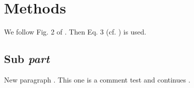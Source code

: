 \section{Methods}
We follow Fig. 2 of \cite{beta}. Then Eq. 3 (cf. \cite{gamma}) is used.

\subsection{Sub \emph{part}}
New paragraph \cite{missing_key}. This one is a comment test %
and continues \cite{delta}.
